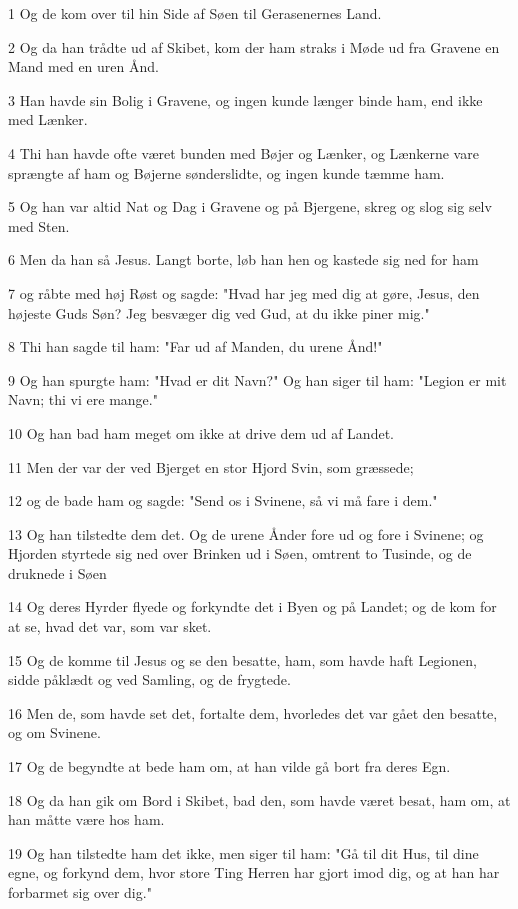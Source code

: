 \par 1 Og de kom over til hin Side af Søen til Gerasenernes Land.
\par 2 Og da han trådte ud af Skibet, kom der ham straks i Møde ud fra Gravene en Mand med en uren Ånd.
\par 3 Han havde sin Bolig i Gravene, og ingen kunde længer binde ham, end ikke med Lænker.
\par 4 Thi han havde ofte været bunden med Bøjer og Lænker, og Lænkerne vare sprængte af ham og Bøjerne sønderslidte, og ingen kunde tæmme ham.
\par 5 Og han var altid Nat og Dag i Gravene og på Bjergene, skreg og slog sig selv med Sten.
\par 6 Men da han så Jesus. Langt borte, løb han hen og kastede sig ned for ham
\par 7 og råbte med høj Røst og sagde: "Hvad har jeg med dig at gøre, Jesus, den højeste Guds Søn? Jeg besvæger dig ved Gud, at du ikke piner mig."
\par 8 Thi han sagde til ham: "Far ud af Manden, du urene Ånd!"
\par 9 Og han spurgte ham: "Hvad er dit Navn?" Og han siger til ham: "Legion er mit Navn; thi vi ere mange."
\par 10 Og han bad ham meget om ikke at drive dem ud af Landet.
\par 11 Men der var der ved Bjerget en stor Hjord Svin, som græssede;
\par 12 og de bade ham og sagde: "Send os i Svinene, så vi må fare i dem."
\par 13 Og han tilstedte dem det. Og de urene Ånder fore ud og fore i Svinene; og Hjorden styrtede sig ned over Brinken ud i Søen, omtrent to Tusinde, og de druknede i Søen
\par 14 Og deres Hyrder flyede og forkyndte det i Byen og på Landet; og de kom for at se, hvad det var, som var sket.
\par 15 Og de komme til Jesus og se den besatte, ham, som havde haft Legionen, sidde påklædt og ved Samling, og de frygtede.
\par 16 Men de, som havde set det, fortalte dem, hvorledes det var gået den besatte, og om Svinene.
\par 17 Og de begyndte at bede ham om, at han vilde gå bort fra deres Egn.
\par 18 Og da han gik om Bord i Skibet, bad den, som havde været besat, ham om, at han måtte være hos ham.
\par 19 Og han tilstedte ham det ikke, men siger til ham: "Gå til dit Hus, til dine egne, og forkynd dem, hvor store Ting Herren har gjort imod dig, og at han har forbarmet sig over dig."
